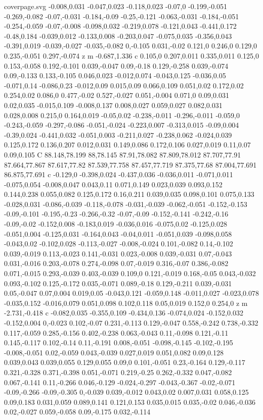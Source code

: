 \begin{filecontents}[noheader]{coverpage.svg}
-0.008,0.031 -0.047,0.023 -0.118,0.023 -0.07,0 -0.199,-0.051 -0.269,-0.082 -0.07,-0.031 -0.184,-0.09 -0.25,-0.121 -0.063,-0.031 -0.184,-0.051 -0.254,-0.059 -0.07,-0.008 -0.098,0.032 -0.219,0.078 -0.121,0.043 -0.441,0.172 -0.48,0.184 -0.039,0.012 -0.133,0.008 -0.203,0.047 -0.075,0.035 -0.356,0.043 -0.391,0.019 -0.039,-0.027 -0.035,-0.082 0,-0.105 0.031,-0.02 0.121,0 0.246,0 0.129,0 0.235,-0.051 0.297,-0.074 z m -0.687,1.336 c 0.105,0 0.207,0.011 0.335,0.011 0.125,0 0.153,-0.058 0.192,-0.101 0.039,-0.047 0.09,-0.18 0.129,-0.258 0.039,-0.074 0.09,-0.133 0.133,-0.105 0.046,0.023 -0.012,0.074 -0.043,0.125 -0.036,0.05 -0.071,0.14 -0.086,0.23 -0.012,0.09 0.015,0.09 0.066,0.109 0.051,0.02 0.172,0.02 0.254,0.02 0.086,0 0.477,-0.02 0.527,-0.027 0.051,-0.004 0.071,0 0.09,0.031 0.02,0.035 -0.015,0.109 -0.008,0.137 0.008,0.027 0.059,0.027 0.082,0.031 0.028,0.008 0.215,0 0.164,0.019 -0.05,0.02 -0.238,-0.011 -0.296,-0.011 -0.059,0 -0.243,-0.059 -0.297,-0.086 -0.051,-0.024 -0.223,0.007 -0.313,0.015 -0.09,0.004 -0.39,0.024 -0.441,0.032 -0.051,0.003 -0.211,0.027 -0.238,0.062 -0.024,0.039 0.125,0.172 0.136,0.207 0.012,0.031 0.149,0.086 0.172,0.106 0.027,0.019 0.11,0.07 0.09,0.105 C 88.148,78.199 88,78.145 87.91,78.082 87.809,78.012 87.707,77.91 87.664,77.867 87.617,77.82 87.539,77.758 87.457,77.719 87.375,77.68 87.004,77.691 86.875,77.691 c -0.129,0 -0.398,0.024 -0.437,0.036 -0.036,0.011 -0.071,0.011 -0.075,0.054 -0.008,0.047 0.043,0.11 0.071,0.149 0.023,0.039 0.093,0.152 0.144,0.238 0.055,0.082 0.125,0.172 0.16,0.211 0.039,0.035 0.098,0.101 0.075,0.133 -0.028,0.031 -0.086,-0.039 -0.118,-0.078 -0.031,-0.039 -0.062,-0.051 -0.152,-0.153 -0.09,-0.101 -0.195,-0.23 -0.266,-0.32 -0.07,-0.09 -0.152,-0.141 -0.242,-0.16 -0.09,-0.02 -0.152,0.008 -0.183,0.019 -0.036,0.016 -0.075,0.02 -0.125,0.028 -0.051,0.004 -0.125,0.031 -0.164,0.043 -0.04,0.011 -0.051,0.039 -0.098,0.058 -0.043,0.02 -0.102,0.028 -0.113,-0.027 -0.008,-0.024 0.101,-0.082 0.14,-0.102 0.039,-0.019 0.113,-0.023 0.141,-0.031 0.023,-0.008 0.039,-0.031 0.07,-0.043 0.031,-0.016 0.203,-0.078 0.274,-0.098 0.07,-0.019 0.316,-0.07 0.386,-0.082 0.071,-0.015 0.293,-0.039 0.403,-0.039 0.109,0 0.121,-0.019 0.168,-0.05 0.043,-0.032 0.093,-0.102 0.125,-0.172 0.035,-0.071 0.089,-0.18 0.129,-0.211 0.039,-0.031 0.05,-0.047 0.07,0.004 0.019,0.05 -0.043,0.121 -0.059,0.148 -0.011,0.027 -0.023,0.078 -0.035,0.152 -0.016,0.079 0.051,0.098 0.102,0.118 0.05,0.019 0.152,0 0.254,0 z m -2.731,-0.418 c -0.082,0.035 -0.355,0.109 -0.434,0.136 -0.074,0.024 -0.152,0.032 -0.152,0.004 0,-0.023 0.102,-0.07 0.231,-0.113 0.129,-0.047 0.558,-0.242 0.738,-0.332 0.117,-0.059 0.285,-0.156 0.402,-0.238 0.063,-0.043 0.11,-0.098 0.121,-0.11 0.145,-0.117 0.102,-0.14 0.11,-0.191 0.008,-0.051 -0.098,-0.145 -0.102,-0.195 -0.008,-0.051 0.02,-0.059 0.043,-0.039 0.027,0.019 0.051,0.082 0.09,0.128 0.039,0.043 0.039,0.055 0.129,0.055 0.09,0 0.101,-0.051 0.23,-0.164 0.129,-0.117 0.321,-0.328 0.371,-0.398 0.051,-0.071 0.219,-0.25 0.262,-0.332 0.047,-0.082 0.067,-0.141 0.11,-0.266 0.046,-0.129 -0.024,-0.297 -0.043,-0.367 -0.02,-0.071 -0.09,-0.266 -0.09,-0.305 0,-0.039 0.039,-0.012 0.043,0.02 0.007,0.031 0.058,0.125 0.09,0.183 0.031,0.059 0.089,0.141 0.121,0.153 0.035,0.015 0.035,-0.02 0.046,-0.036 0.02,-0.027 0.059,-0.058 0.09,-0.175 0.032,-0.114 
\end{filecontents}
